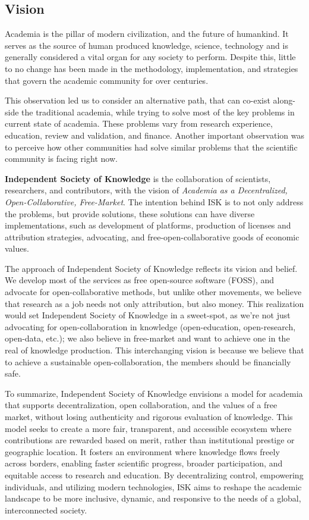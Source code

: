 \subsection{Vision}\label{subsec:vision}
Academia is the pillar of modern civilization, and the future of humankind.
It serves as the source of human produced knowledge, science, technology and is generally considered a vital organ for any society to perform.
Despite this, little to no change has been made in the methodology, implementation, and strategies that govern the academic community for over centuries.

This observation led us to consider an alternative path, that can co-exist along-side the traditional academia, while trying to solve most of the key problems in current state of academia.
These problems vary from research experience, education, review and validation, and finance.
Another important observation was to perceive how other communities had solve similar problems that the scientific community is facing right now.

\textbf{Independent Society of Knowledge} is the collaboration of scientists, researchers, and contributors, with the vision of \textit{Academia as a Decentralized, Open-Collaborative, Free-Market}.
The intention behind ISK is to not only address the problems, but provide solutions, these solutions can have diverse implementations, such as development of platforms, production of licenses and attribution strategies, advocating, and free-open-collaborative goods of economic values.

The approach of Independent Society of Knowledge reflects its vision and belief.
We develop most of the services as free open-source software (FOSS), and advocate for open-collaborative methods, but unlike other movements, we believe that research as a job needs not only attribution, but also money.
This realization would set Independent Society of Knowledge in a sweet-spot, as we're not just advocating for open-collaboration in knowledge (open-education, open-research, open-data, etc.); we also believe in free-market and want to achieve one in the real of knowledge production.
This interchanging vision is because we believe that to achieve a sustainable open-collaboration, the members should be financially safe.

To summarize, Independent Society of Knowledge envisions a model for academia that supports decentralization, open collaboration, and the values of a free market, without losing authenticity and rigorous evaluation of knowledge.
This model seeks to create a more fair, transparent, and accessible ecosystem where contributions are rewarded based on merit, rather than institutional prestige or geographic location.
It fosters an environment where knowledge flows freely across borders, enabling faster scientific progress, broader participation, and equitable access to research and education.
By decentralizing control, empowering individuals, and utilizing modern technologies, ISK aims to reshape the academic landscape to be more inclusive, dynamic, and responsive to the needs of a global, interconnected society.

